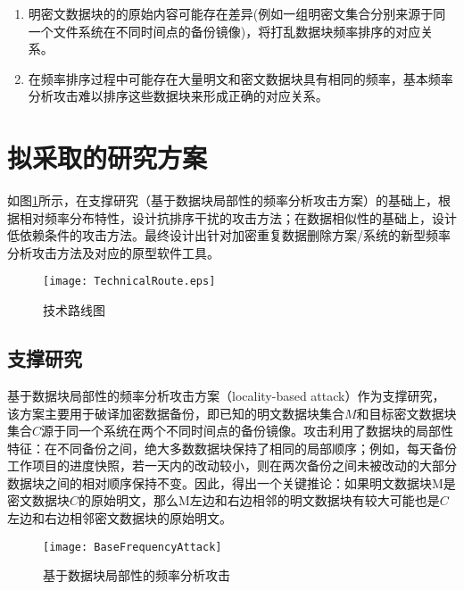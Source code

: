 \begin{enumerate}
    \item 明密文数据块的的原始内容可能存在差异(例如一组明密文集合分别来源于同一个文件系统在不同时间点的备份镜像)，将打乱数据块频率排序的对应关系。
    \item 在频率排序过程中可能存在大量明文和密文数据块具有相同的频率，基本频率分析攻击难以排序这些数据块来形成正确的对应关系。
\end{enumerate}



\section{拟采取的研究方案}
\label{sec:技术路线}



如图\ref{fig:技术路线图}所示，在支撑研究（基于数据块局部性的频率分析攻击方案）的基础上，根据相对频率分布特性，设计抗排序干扰的攻击方法；在数据相似性的基础上，设计低依赖条件的攻击方法。最终设计出针对加密重复数据删除方案/系统的新型频率分析攻击方法及对应的原型软件工具。

\begin{figure}[!htb]
    \small
    \centering
    \texttt{[image: TechnicalRoute.eps]}
    \caption{技术路线图} 
    \label{fig:技术路线图}
\end{figure}

\subsection{支撑研究}

基于数据块局部性的频率分析攻击方案（locality-based attack）作为支撑研究，该方案主要用于破译加密数据备份，即已知的明文数据块集合$M$和目标密文数据块集合$C$源于同一个系统在两个不同时间点的备份镜像。攻击利用了数据块的局部性特征：在不同备份之间，绝大多数数据块保持了相同的局部顺序；例如，每天备份工作项目的进度快照，若一天内的改动较小，则在两次备份之间未被改动的大部分数据块之间的相对顺序保持不变。因此，得出一个关键推论：如果明文数据块M是密文数据块$C$的原始明文，那么M左边和右边相邻的明文数据块有较大可能也是$C$左边和右边相邻密文数据块的原始明文。

\begin{figure}[!htb]
    \small
    \centering
    \texttt{[image: BaseFrequencyAttack]}
    \caption{基于数据块局部性的频率分析攻击} 
    \label{fig:基于数据块局部性的频率分析攻击}
\end{figure}


